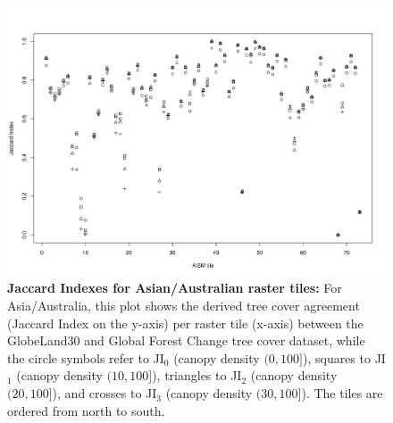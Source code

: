 	\begin{landscape}
		\begin{figure}[ht]
			\centering
			\includegraphics[scale=.65]{img/jaccard_tiles_asia}
			\caption[Jaccard Indexes for Asian/Australian raster tiles]{\textbf{Jaccard Indexes for Asian/Australian raster tiles:} For Asia/Australia, this plot shows the derived tree cover agreement (Jaccard Index on the y-axis) per raster tile (x-axis) between the GlobeLand30 and Global Forest Change tree cover dataset, while the circle symbols refer to JI$_0$ (canopy density $(0,100]$), squares to JI$_1$ (canopy density $(10,100]$), triangles to JI$_2$ (canopy density $(20,100]$), and crosses to JI$_3$ (canopy density $(30,100]$). The tiles are ordered from north to south.}
			\label{fig:jaccard_asia_appendix}
		\end{figure}
	\end{landscape}

